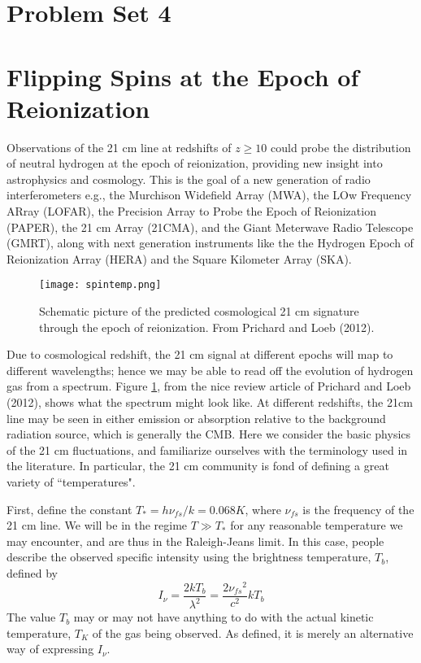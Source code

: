 \documentclass[11pt]{article}
\begin{document}
\pagestyle{empty}

\def\nufs{{\nu_{fs}}}
\section*{\centering Problem Set 4}

\section{Flipping Spins at the Epoch of Reionization}

Observations of the 21 cm line at redshifts of $z\ge10$ could probe the
distribution of neutral hydrogen at the epoch of reionization, providing new
insight into astrophysics and cosmology. This is the goal of a new generation
of radio interferometers e.g., the Murchison Widefield Array (MWA), the LOw
Frequency ARray (LOFAR), the Precision Array to Probe the Epoch of Reionization
(PAPER), the 21 cm Array (21CMA), and the Giant Meterwave Radio Telescope
(GMRT), along with next generation instruments like the 
the Hydrogen Epoch of Reionization Array (HERA) and the
Square Kilometer Array (SKA).

\begin{figure}[!ht]
\texttt{[image: spintemp.png]}
\caption{
Schematic picture of the predicted cosmological 21 cm signature through the
epoch of reionization. From Prichard and Loeb (2012).
}\label{fig:spintemp}
\end{figure}

Due to cosmological redshift, the 21 cm signal at different epochs will map to
different wavelengths; hence we may be able to read off the evolution of
hydrogen gas from a spectrum. Figure \ref{fig:spintemp}, from the nice review article of
Prichard and Loeb (2012), shows what the spectrum might look like. At
different redshifts, the 21cm line may be seen in either emission or absorption
relative to the background radiation source, which is generally the CMB. Here
we consider the basic physics of the 21 cm fluctuations, and familiarize
ourselves with the terminology used in the literature. In particular, the 21 cm
community is fond of defining a great variety of ``temperatures".

First, define the constant $T_*=h\nufs/k=0.068 K$, where $\nufs$ is the
frequency of the 21 cm line. We will be in the regime $T\gg T_*$ for any reasonable
temperature we may encounter, and are thus in the Raleigh-Jeans limit. In this
case, people describe the observed specific intensity using the brightness
temperature, $T_b$, defined by
\begin{equation}
I_\nu=\frac{2kT_b}{\lambda^2}=\frac{2\nufs^2}{c^2}kT_b
\end{equation}
The value $T_b$ may or may not have anything to do with the actual kinetic
temperature, $T_K$ of the gas being observed. As defined, it is merely an
alternative way of expressing $I_\nu$.
\end{document}
